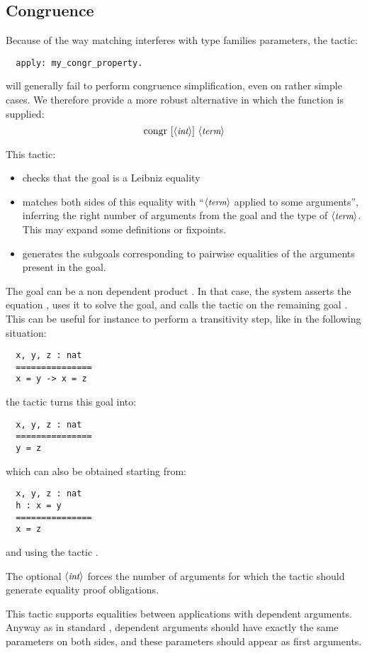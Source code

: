 \subsection{Congruence}\label{ssec:congr}

Because of the way matching interferes with type families parameters,
the tactic:
\begin{lstlisting}
  apply: my_congr_property.
\end{lstlisting}
will generally fail to perform congruence simplification, even on
rather simple cases. We therefore provide a
more robust alternative in which the function is supplied:
$$\C{congr}\ [\N{int}]\ \N{term}$$

This tactic:
\begin{itemize}
\item checks that the goal is a Leibniz equality
\item matches both sides of this equality with ``$\langle\mbox{\itshape\rmfamily\small term}\rangle$ applied to
  some arguments'', inferring the right number of arguments from the goal
  and the type of $\langle\mbox{\itshape\rmfamily\small term}\rangle$. This may
  expand some definitions or fixpoints.
\item generates the subgoals corresponding to pairwise equalities of
  the arguments present in the goal.
\end{itemize}

The goal can be a non dependent product .
In that case, the system asserts the equation , uses it to solve
the goal, and calls the  tactic on the remaining goal
. This can be useful for instance to perform a transitivity
step, like in the following situation:
\begin{lstlisting}
  x, y, z : nat
  ===============
  x = y -> x = z
\end{lstlisting}
the tactic  turns this goal into:

\begin{lstlisting}
  x, y, z : nat
  ===============
  y = z
\end{lstlisting}
which can also be obtained starting from:
\begin{lstlisting}
  x, y, z : nat
  h : x = y
  ===============
  x = z
\end{lstlisting}
and using the tactic .

The optional $\langle\mbox{\itshape\rmfamily\small int}\rangle$ forces the number of arguments for which the
tactic should generate equality proof obligations.

This tactic supports equalities between applications with dependent
arguments. Anyway as in standard
\Coq{}, dependent arguments should have exactly the same
parameters on both sides, and these parameters should appear as first
arguments.

